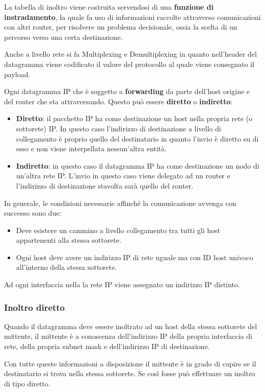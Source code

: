 La tabella di inoltro viene costruita servendosi di una
\textbf{funzione di instradamento}, la quale fa uso di informazioni
raccolte attraverso comunicazioni con altri router, per risolvere un
problema decisionale, ossia la scelta di un percorso verso una certa
destinazione.

Anche a livello rete si fa Multiplexing e Demultiplexing in quanto
nell'header del datagramma viene codificato il valore del protocollo 
al quale viene consegnato il payload.

Ogni datagramma IP che è soggetto a \textbf{forwarding} da parte 
dell'host origine e del router che sta attraversando. Questo può 
essere \textbf{diretto} o \textbf{indiretto}:
\begin{itemize}
	\item \textbf{Diretto}: il pacchetto IP ha come destinazione un
		host nella propria rete (o sottorete) IP. In questo caso 
		l'indirizzo di destinazione a livello di collegamento è 
		proprio quello del destinatario in quanto l'invio è diretto 
		su di esso e non viene interpellata nessun'altra entità.
	\item \textbf{Indiretto}: in questo caso il datagramma IP ha come 
		destinazione un nodo di un'altra rete IP. L'invio in questo
		caso viene delegato ad un router e l'indirizzo di destinazione
		stavolta sarà quello del router.
\end{itemize}
In generale, le condizioni necessarie affinché la comunicazione 
avvenga con successo sono due:
\begin{itemize}
	\item Deve esistere un cammino a livello collegamento tra tutti 
		gli host appartenenti alla stessa sottorete.
	\item Ogni host deve avere un indirizzo IP di rete uguale ma con
		ID host univoco all'interno della stessa sottorete.
\end{itemize}
Ad ogni interfaccia nella la rete IP viene assegnato un indirizzo IP 
distinto.

\subsubsection{Inoltro diretto}
Quando il datagramma deve essere inoltrato ad un host della stessa 
sottorete del mittente, il mittente è a conoscenza dell'indirizzo IP
della propria interfaccia di rete, della propria subnet mask e 
dell'indirizzo IP di destinazione.

Con tutte queste informazioni a disposizione il mittente è in grado di
capire se il destinatario si trova nella stessa sottorete. Se così
fosse può effettuare un inoltro di tipo diretto.

